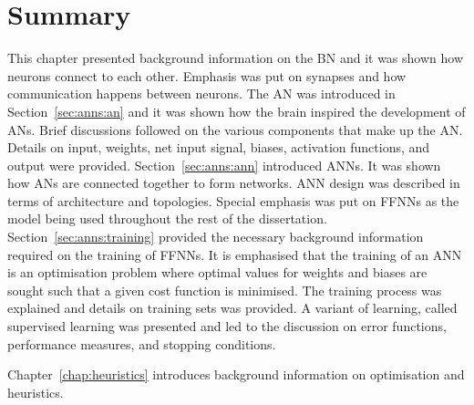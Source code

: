 \section{Summary}
\label{sec:anns:summary}

This chapter presented background information on the \ac{BN} and it was shown
how neurons connect to each other. Emphasis was put on synapses
and how communication happens between neurons. The \ac{AN} was introduced in
Section~\ref{sec:anns:an} and it was shown how the brain inspired the
development of \acp{AN}. Brief discussions followed on the various components
that make up the \ac{AN}. Details on input, weights, net
input signal, biases, activation functions, and
output were provided.  Section~\ref{sec:anns:ann} introduced \acp{ANN}. It was
shown how \acp{AN} are connected together to form networks. \ac{ANN} design was
described in terms of architecture and topologies. Special emphasis was put on
\acp{FFNN} as the model being used throughout the rest of the dissertation.
Section~\ref{sec:anns:training} provided the necessary background information
required on the training of \acp{FFNN}. It is emphasised that the training of an
\ac{ANN} is an optimisation problem where optimal values for weights and biases
are sought such that a given cost function is minimised. The training process
was explained and details on training sets was provided. A variant of learning,
called supervised learning was presented and led to
the discussion on error functions, performance measures, and stopping
conditions.

Chapter~\ref{chap:heuristics} introduces background information on optimisation
and heuristics. 

